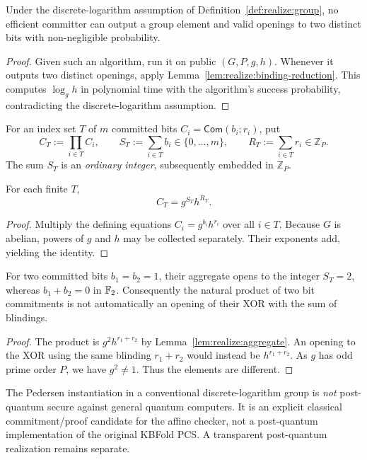 \begin{theorem}\label{thm:realize:binding}
Under the discrete-logarithm assumption of
Definition~\ref{def:realize:group}, no efficient
committer can output a group element and valid
openings to two distinct bits with non-negligible probability.
\end{theorem}
\begin{proof}
Given such an algorithm, run it on
public $(G,P,g,h)$. Whenever it outputs
two distinct openings, apply
Lemma~\ref{lem:realize:binding-reduction}.
This computes $\log_g h$ in polynomial time
with the algorithm's success probability,
contradicting the discrete-logarithm assumption.
\end{proof}

\begin{definition}\label{def:realize:product}
For an index set $T$ of $m$ committed bits
$C_i=\mathsf{Com}(b_i;r_i)$, put
\[
 C_T:=\prod_{i\in T} C_i,\qquad
 S_T:=\sum_{i\in T}b_i\in\{0,\ldots,m\},
 \qquad R_T:=\sum_{i\in T}r_i\in\mathbb Z_P.
\]
The sum $S_T$ is an \emph{ordinary integer},
subsequently embedded in $\mathbb Z_P$.
\end{definition}

\begin{lemma}\label{lem:realize:aggregate}
For each finite $T$,
\[
 \boxed{C_T=g^{S_T}h^{R_T}.}
\]
\end{lemma}
\begin{proof}
Multiply the defining equations
$C_i=g^{b_i}h^{r_i}$ over all $i\in T$.
Because $G$ is abelian, powers of $g$
and $h$ may be collected separately.
Their exponents add, yielding the identity.
\end{proof}

\begin{lemma}\label{lem:realize:no-xor}
For two committed bits $b_1=b_2=1$,
their aggregate opens to the integer $S_T=2$,
whereas $b_1+b_2=0$ in $\mathbb{F}_2$.
Consequently the natural product of two
bit commitments is not automatically an
opening of their XOR with the sum of blindings.
\end{lemma}
\begin{proof}
The product is $g^2h^{r_1+r_2}$
by Lemma~\ref{lem:realize:aggregate}.
An opening to the XOR using the same
blinding $r_1+r_2$ would instead be
$h^{r_1+r_2}$. As $g$ has odd prime order
$P$, we have $g^2\ne1$. Thus the elements
are different.
\end{proof}

\begin{remark}
The Pedersen instantiation in a conventional
discrete-logarithm group is \emph{not}
post-quantum secure against general quantum
computers. It is an explicit classical
commitment/proof candidate for the affine
checker, not a post-quantum implementation
of the original KBFold PCS. A transparent
post-quantum realization remains separate.
\end{remark}
